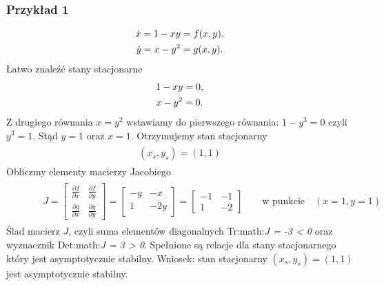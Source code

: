 \documentclass[a4paper,12pt,polish]{sphinxmanual}
\begin{document}
\subsubsection{Przykład 1}
\label{ch1/chI023:przyklad-1}\label{ch1/chI023:equation-eqn47}\begin{gather}
\begin{split}\dot x= 1-xy = f(x, y),\end{split}\label{ch1/chI023-eqn47}\\\begin{split}\dot y = x-y^2 = g(x, y).\end{split}\notag
\end{gather}
Łatwo znaleźć stany stacjonarne
\label{ch1/chI023:equation-eqn48}\begin{gather}
\begin{split} 1-xy = 0,\end{split}\label{ch1/chI023-eqn48}\\\begin{split} x-y^2 = 0.\end{split}\notag
\end{gather}
Z drugiego równania $x=y^2$ wstawiamy do pierwszego równania: $1-y^3=0$ czyli $y^3=1$. Stąd $y=1$ oraz $x=1$. Otrzymujemy stan stacjonarny
\label{ch1/chI023:equation-eqn49}\begin{gather}
\begin{split}(x_s, y_s) = (1, 1)\end{split}\label{ch1/chI023-eqn49}
\end{gather}
Obliczmy elementy macierzy Jacobiego
\label{ch1/chI023:equation-eqn50}\begin{gather}
\begin{split} \qquad \quad J = \begin{bmatrix}\frac{ \partial f}{\partial x}& \frac{\partial f}{\partial y}\\ \frac{\partial g}{\partial x}& \frac{\partial g}{\partial y}  \end{bmatrix}  =   \begin{bmatrix}-y & -x \\ 1& -2y  \end{bmatrix}    =  \begin{bmatrix}-1 & -1 \\ 1& -2  \end{bmatrix}\quad \quad \mbox{w punkcie} \quad (x=1, y=1)\end{split}\label{ch1/chI023-eqn50}
\end{gather}
Ślad macierz $J$, czyli suma elementów diagonalnych Tr:math:\emph{J = -3 \textless{} 0} oraz wyznacznik Det:math:\emph{J = 3 \textgreater{} 0}. Spełnione są relacje dla stany stacjonarnego który jest asymptotycznie stabilny. Wniosek: stan stacjonarny $(x_s, y_s) = (1, 1)$ jest asymptotycznie stabilny.
\end{document}
